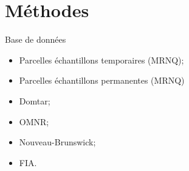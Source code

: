 \documentclass{eecslides}
\begin{document}
%
%	
%
%

\section{Méthodes}

	\begin{frame}{Base de données}
		\begin{itemize}
			\item Parcelles échantillons temporaires (MRNQ);
			\item Parcelles échantillons permanentes (MRNQ)
			\item Domtar;
			\item OMNR;
			\item Nouveau-Brunswick;
			\item FIA.
		\end{itemize}
	\end{frame}

\end{document}
